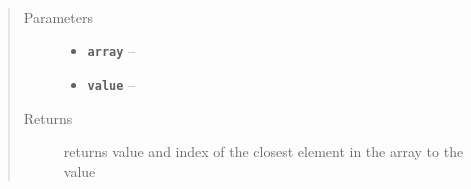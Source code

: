 \documentclass[letterpaper,10pt,english]{sphinxmanual}
\begin{document}
\begin{fulllineitems}
\label{library:library.autoscale_data}
\end{fulllineitems}


\begin{fulllineitems}
\label{library:library.find_nearest}~\begin{quote}\begin{description}
\item[{Parameters}] \leavevmode\begin{itemize}
\item {} 
\textbf{\texttt{array}} -- 

\item {} 
\textbf{\texttt{value}} -- 

\end{itemize}

\item[{Returns}] \leavevmode
returns value and index of the closest element in the array to the value

\end{description}\end{quote}

\end{fulllineitems}


\begin{fulllineitems}
\label{library:library.find_in_list_array}
\end{fulllineitems}


\begin{fulllineitems}
\label{library:library.find_within_range}
\end{fulllineitems}


\begin{fulllineitems}
\label{library:library.norm}
\end{fulllineitems}
\end{document}
